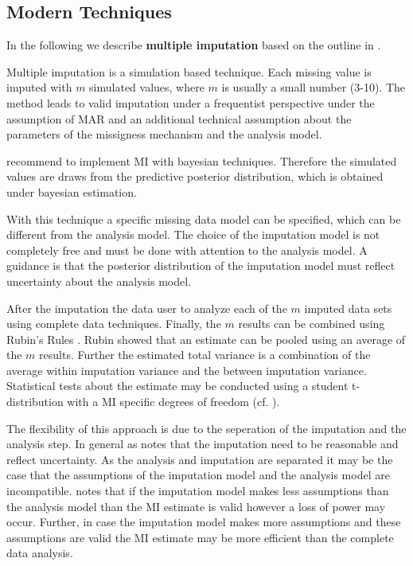 \subsection{Modern Techniques} 
 In the following we describe \textbf{multiple imputation} based on the outline in \cite{Schafer99}. \par  
Multiple imputation is a simulation based technique. Each missing value is imputed with $m$  simulated  values, where $m$ is usually a small number (3-10). The method leads to valid imputation under a frequentist perspective under the assumption of MAR and an additional technical assumption about the parameters of the missigness mechanism and the analysis model. \par 
\cite{Little} recommend to implement MI with bayesian techniques. Therefore the simulated values are draws from the predictive posterior distribution, which is obtained under bayesian estimation.  \par
 With this technique a specific missing data model can be specified, which can be different from the analysis model. The choice of the imputation model is not completely free and must be done with attention to the analysis model. A guidance is that the posterior distribution of the imputation model must reflect uncertainty about the analysis model. \par 
After the imputation  the data user to analyze each of the $m$ imputed data sets using complete data techniques. Finally, the $m$ results can be combined using Rubin's Rules \cite{rubin1987multiple}.  Rubin showed that an estimate can be pooled using an average of the $m$ results. Further the estimated total variance is a combination of the average within imputation variance and the between imputation variance. Statistical tests about the estimate may be conducted using a student t-distribution with a MI specific degrees of freedom (cf. \cite{Schafer99}).   \par The flexibility of this approach is due to the seperation of the imputation and the analysis step. In general as \cite{Schafer99} notes that the imputation need to be reasonable and reflect uncertainty. As the analysis and imputation are separated it may be the case that the assumptions of the imputation model and the analysis model are incompatible. \cite{Schafer99} notes that if the imputation model makes less assumptions than the  analysis model than the MI estimate is valid however a loss of power may occur. Further, in case the imputation model makes more assumptions and these assumptions are valid the MI estimate may be more efficient than the complete data analysis. \par 
